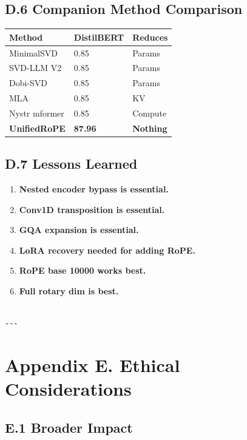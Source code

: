 {\subsection{D.6 Companion Method Comparison}

\begin{table}[H]
\centering
\small
\begin{tabular}{lll}
\toprule
\textbf{Method} & \textbf{DistilBERT} & \textbf{Reduces} \\
\midrule
MinimalSVD & 0.85 & Params \\
SVD-LLM V2 & 0.85 & Params \\
Dobi-SVD & 0.85 & Params \\
MLA & 0.85 & KV \\
Nystr mformer & 0.85 & Compute \\
\textbf{UnifiedRoPE} & \textbf{87.96} & \textbf{Nothing} \\
\bottomrule
\end{tabular}
\end{table}

\subsection{D.7 Lessons Learned}

\begin{enumerate}
\item \textbf{Nested encoder bypass is essential.}
\item \textbf{Conv1D transposition is essential.}
\item \textbf{GQA expansion is essential.}
\item \textbf{LoRA recovery needed for adding RoPE.}
\item \textbf{RoPE base 10000 works best.}
\item \textbf{Full rotary dim is best.}
\end{enumerate}
\begin{lstlisting}

---
\end{lstlisting}


\section{Appendix E. Ethical Considerations}

\subsection{E.1 Broader Impact}

}
